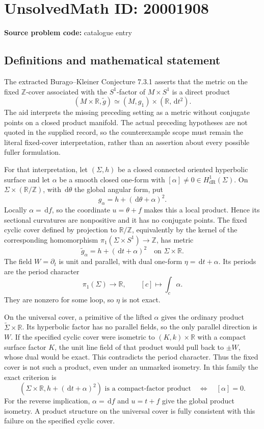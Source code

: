 \documentclass[11pt]{article}
\newcommand{\Z}{\mathbb{Z}}
\newcommand{\R}{\mathbb{R}}
\newcommand{\dd}{\,\mathrm{d}}
\begin{document}
\section*{UnsolvedMath ID: 20001908}
\textbf{Source problem code:} catalogue entry
\subsection{Definitions and mathematical statement}
The extracted Burago--Kleiner Conjecture 7.3.1 asserts that the metric on the fixed \(\Z\)-cover associated with the \(S^1\)-factor of \(M\times S^1\) is a direct product
\[
 (M\times\R,\widetilde g)\simeq(M,g_1)\times(\R,\dd t^2).
\]
The aid interprets the missing preceding setting as a metric without conjugate points on a closed product manifold. The actual preceding hypotheses are not quoted in the supplied record, so the counterexample scope must remain the literal fixed-cover interpretation, rather than an assertion about every possible fuller formulation.

For that interpretation, let \((\Sigma,h)\) be a closed connected oriented hyperbolic surface and let \(\alpha\) be a smooth closed one-form with \([\alpha]\ne0\in H^1_{\mathrm{dR}}(\Sigma)\). On \(\Sigma\times(\R/\Z)\), with \(\dd\theta\) the global angular form, put
\[
 g_\alpha=h+(\dd\theta+\alpha)^2.
\]
Locally \(\alpha=\dd f\), so the coordinate \(u=\theta+f\) makes this a local product. Hence its sectional curvatures are nonpositive and it has no conjugate points. The fixed cyclic cover defined by projection to \(\R/\Z\), equivalently by the kernel of the corresponding homomorphism \(\pi_1(\Sigma\times S^1)\to\Z\), has metric
\[
 \widetilde g_\alpha=h+(\dd t+\alpha)^2\quad\text{on }\Sigma\times\R.
\]
The field \(W=\partial_t\) is unit and parallel, with dual one-form
\(\eta=\dd t+\alpha\). Its periods are the period character
\[
 \pi_1(\Sigma)\longrightarrow\R,\qquad
 [c]\longmapsto\int_c\alpha.
\]
They are nonzero for some loop, so \(\eta\) is not exact.

On the universal cover, a primitive of the lifted \(\alpha\) gives the ordinary product \(\widetilde\Sigma\times\R\). Its hyperbolic factor has no parallel fields, so the only parallel direction is \(W\). If the specified cyclic cover were isometric to \((K,k)\times\R\) with a compact surface factor \(K\), the unit line field of that product would pull back to \(\pm W\), whose dual would be exact. This contradicts the period character. Thus the fixed cover is not such a product, even under an unmarked isometry. In this family the exact criterion is
\[
 (\Sigma\times\R,h+(\dd t+\alpha)^2)
 \text{ is a compact-factor product}\quad\Longleftrightarrow\quad[\alpha]=0.
\]
For the reverse implication, \(\alpha=\dd f\) and \(u=t+f\) give the global product isometry. A product structure on the universal cover is fully consistent with this failure on the specified cyclic cover.
\end{document}
